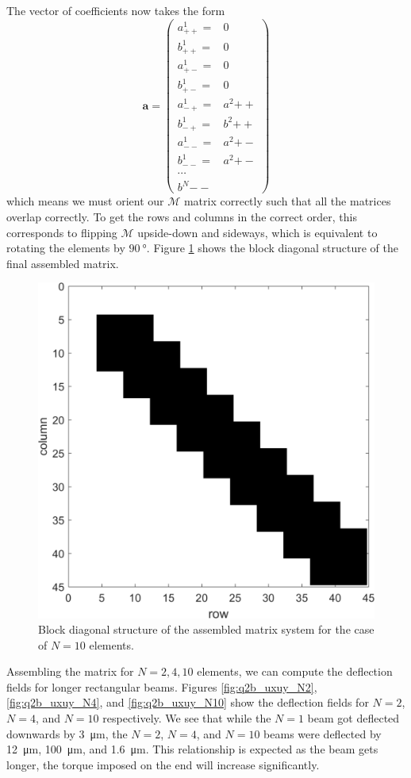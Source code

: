 \documentclass[11pt]{article}
\begin{document}
The vector of coefficients now takes the form
\begin{equation}
\bm{a} =
\begin{pmatrix}
	a^1_{++} = & 0 \\
	b^1_{++} = & 0 \\
	a^1_{+-} = & 0 \\
	b^1_{+-} = & 0 \\
	a^1_{-+} = & a^2{++} \\
	b^1_{-+} = & b^2{++} \\
	a^1_{--} = & a^2{+-} \\
	b^1_{--} = & a^2{+-} \\
	\cdots \\
	b^N{--}
\end{pmatrix}
\end{equation}
which means we must orient our $\mathcal{M}$ matrix correctly such that all the matrices overlap correctly. To get the rows and columns in the correct order, this corresponds to flipping $\mathcal{M}$ upside-down and sideways, which is equivalent to rotating the elements by $\SI{90}{\degree}$. Figure \ref{fig:M2b_spy} shows the block diagonal structure of the final assembled matrix.

\begin{figure}[!htb]
	\centering
	\includegraphics[width=0.7\linewidth]{M2b_spy.png}
	\caption{Block diagonal structure of the assembled matrix system for the case of $N=10$ elements.}
	\label{fig:M2b_spy}
\end{figure}

Assembling the matrix for $N=2,4,10$ elements, we can compute the deflection fields for longer rectangular beams. Figures \ref{fig:q2b_uxuy_N2}, \ref{fig:q2b_uxuy_N4}, and \ref{fig:q2b_uxuy_N10} show the deflection fields for $N=2$, $N=4$, and $N=10$ respectively. We see that while the $N=1$ beam got deflected downwards by \SI{3}{\micro\m}, the $N=2$, $N=4$, and $N=10$ beams were deflected by \SI{12}{\micro\m}, \SI{100}{\micro\m}, and \SI{1.6}{\micro\m}. This relationship is expected as the beam gets longer, the torque imposed on the end will increase significantly.
\end{document}
